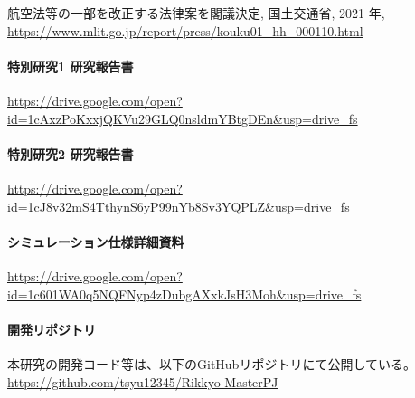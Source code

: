 \documentclass{article}[jsarticle]
\begin{document}
\begin{thebibliography}{9}
     航空法等の一部を改正する法律案を閣議決定, 国土交通省, 2021 年, \url{https://www.mlit.go.jp/report/press/kouku01_hh_000110.html}
\end{thebibliography}

\begin{appendix}
    \paragraph{特別研究1 研究報告書} \par
    \url{https://drive.google.com/open?id=1cAxzPoKxxjQKVu29GLQ0nsldmYBtgDEn&usp=drive_fs}

    \paragraph{特別研究2 研究報告書} \par
    \url{https://drive.google.com/open?id=1cJ8v32mS4TthynS6yP99nYb8Sv3YQPLZ&usp=drive_fs}

    \paragraph{シミュレーション仕様詳細資料} \par 
    \url{https://drive.google.com/open?id=1c601WA0q5NQFNyp4zDubgAXxkJsH3Moh&usp=drive_fs}

    \paragraph{開発リポジトリ} \par
    本研究の開発コード等は、以下のGitHubリポジトリにて公開している。
    \url{https://github.com/tsyu12345/Rikkyo-MasterPJ}

\end{appendix}
\end{document}
